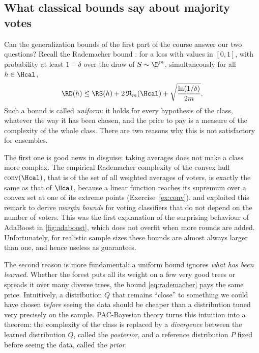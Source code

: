 \subsection{What classical bounds say about majority votes}

Can the generalization bounds of the first part of the course answer our two
questions? Recall the Rademacher bound \citep{bartlett2002rademacher,mohri2018foundations}:
for a loss with values in $[0,1]$, with probability at least $1-\delta$ over the
draw of $S\sim\D^m$, simultaneously for all $h\in\Hcal$,
\begin{equation}\label{eq:rademacher}
  \RD(h)\leq \RS(h)+2\,\mathfrak{R}_m(\Hcal)+\sqrt{\frac{\ln(1/\delta)}{2m}}.
\end{equation}
Such a bound is called \emph{uniform}: it holds for every hypothesis of the
class, whatever the way it has been chosen, and the price to pay is a measure
of the complexity of the whole class. There are two reasons why this is not
satisfactory for ensembles.

The first one is good news in disguise: taking averages does not make a class
more complex. The empirical Rademacher complexity of the convex hull
$\mathrm{conv}(\Hcal)$, that is of the set of all weighted averages of voters, is
exactly the same as that of $\Hcal$, because a linear function reaches its
supremum over a convex set at one of its extreme points (Exercise~\ref{ex:conv}).
\citet{schapire1998boosting} and \citet{koltchinskii2002empirical} exploited this
remark to derive \emph{margin bounds} for voting classifiers that do not depend
on the number of voters. This was the first explanation of the surprising
behaviour of AdaBoost in \cref{fig:adaboost}, which does not overfit when more
rounds are added. Unfortunately, for realistic sample sizes these bounds are
almost always larger than one, and hence useless as guarantees.

The second reason is more fundamental: a uniform bound ignores \emph{what has
been learned}. Whether the forest puts all its weight on a few very good trees or
spreads it over many diverse trees, the bound \eqref{eq:rademacher} pays the same
price. Intuitively, a distribution $Q$ that remains ``close'' to something we
could have chosen \emph{before} seeing the data should be cheaper than a
distribution tuned very precisely on the sample. PAC-Bayesian theory turns this
intuition into a theorem: the complexity of the class is replaced by a
\emph{divergence} between the learned distribution $Q$, called the
\emph{posterior}, and a reference distribution $P$ fixed before seeing the data,
called the \emph{prior}.

